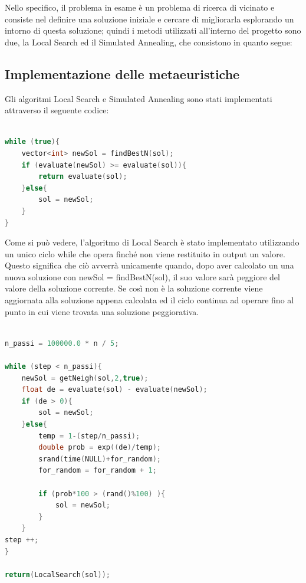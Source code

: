 \documentclass[preprint,12pt]{elsarticle}
\begin{document}
Nello specifico, il problema in esame è un problema di ricerca di vicinato e consiste nel definire una soluzione iniziale e cercare di migliorarla esplorando un intorno di questa soluzione; quindi i metodi utilizzati all'interno del progetto sono due, la Local Search ed il Simulated Annealing, che consistono in quanto segue:



\subsection{Implementazione delle metaeuristiche}

Gli algoritmi Local Search e Simulated Annealing sono stati implementati attraverso il seguente codice:


\begin{lstlisting}[basicstyle=\small, caption={Local Search}, frame=single, language=C++]

while (true){
	vector<int> newSol = findBestN(sol);
	if (evaluate(newSol) >= evaluate(sol)){	
		return evaluate(sol);
	}else{					
		sol = newSol;
	}
}


\end{lstlisting}


Come si può vedere, l'algoritmo di Local Search è stato implementato utilizzando un unico ciclo while che opera finché non viene restituito in output un valore. Questo significa che ciò avverrà unicamente quando, dopo aver calcolato un una nuova soluzione con newSol = findBestN(sol), il suo valore sarà peggiore del valore della soluzione corrente. Se così non è la soluzione corrente viene aggiornata alla soluzione appena calcolata ed il ciclo continua ad operare fino al punto in cui viene trovata una soluzione peggiorativa. 


\begin{lstlisting}[basicstyle=\small, caption={Simulated Annealing}, frame=single, language=C++]

n_passi = 100000.0 * n / 5;

while (step < n_passi){
	newSol = getNeigh(sol,2,true);			
	float de = evaluate(sol) - evaluate(newSol);
	if (de > 0){
		sol = newSol;
	}else{ 
		temp = 1-(step/n_passi);	
		double prob = exp((de)/temp);	
		srand(time(NULL)+for_random);		
		for_random = for_random + 1;
		
		if (prob*100 > (rand()%100) ){
			sol = newSol;
		}
	}
step ++; 
}

return(LocalSearch(sol));
	
\end{lstlisting}
\end{document}
